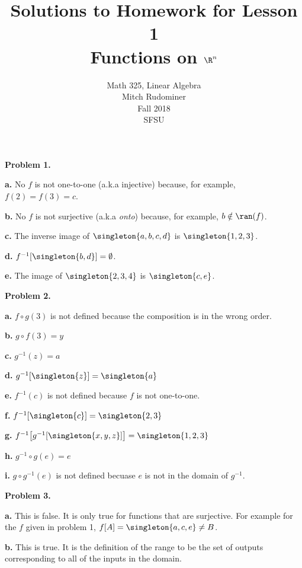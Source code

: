 \documentclass[oneside,12pt]{amsart}
\begin{document}
\title{Solutions to Homework for Lesson 1 \\ Functions on $\R^n$}
\author{Math 325, Linear Algebra \\ Mitch Rudominer \\ Fall 2018 \\ SFSU }
\date{}

\maketitle


\textbf{Problem 1.}

\textbf{a.} No $f$ is not one-to-one (a.k.a injective) because, for example,
$f(2) = f(3) = c$.

\textbf{b.} No $f$ is not surjective (a.k.a \emph{onto}) because, for example,
$b\notin\ran(f)$.

\textbf{c.} The inverse image of $\singleton{a,b,c,d}$ is $\singleton{1,2,3}$.

\textbf{d.} $f^{-1}[\singleton{b, d}] = \emptyset$.


\textbf{e.} The image of $\singleton{2,3,4}$ is $\singleton{c, e}$.

\medskip

\textbf{Problem 2.}

\textbf{a.} $f\circ g (3)$ is not defined because the composition is in the wrong order.

\textbf{b.} $g\circ f (3) = y$


\textbf{c.} $g^{-1}(z) = a$


\textbf{d.} $g^{-1}[\singleton{z}] = \singleton{a}$


\textbf{e.} $f^{-1}(c)$ is not defined because $f$ is not one-to-one.


\textbf{f.} $f^{-1}[\singleton{c}] = \singleton{2,3}$


\textbf{g.} $f^{-1}\big[g^{-1}[\singleton{x, y, z}]\big] = \singleton{1,2,3}$


\textbf{h.} $g^{-1} \circ g (e) = e$

\textbf{i.} $g \circ g^{-1} (e)$ is not defined becuase $e$ is not in the domain of $g^{-1}$.

\medskip

\textbf{Problem 3.}

\textbf{a.} This is false. It is only true for functions that are surjective.
For example for the $f$ given in problem 1,  $f[A] = \singleton{a,c,e} \not= B$.

\textbf{b.} This is true. It is the definition of the range to be the set of
outputs corresponding to all of the inputs in the domain.
\end{document}
